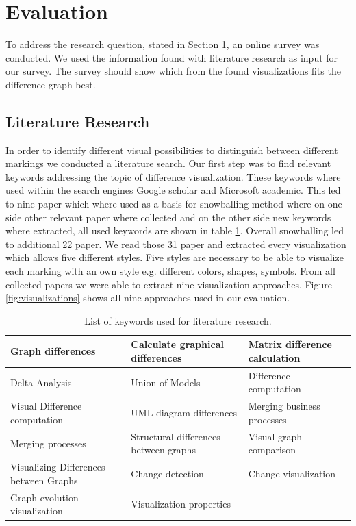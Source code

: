 \documentclass{llncs}
\begin{document}
\section{Evaluation} %
\label{sec:Evaluation} %
To address the research question, stated in Section 1, an online survey was conducted. We used the information found with literature research as input for our survey. The survey should show which from the found visualizations fits the difference graph best.

\subsection{Literature Research} %
\label{sec:LitResearch}
In order to identify different visual possibilities to distinguish between different markings we conducted a literature search. Our first step was to find relevant keywords addressing the topic of difference visualization. These keywords where used within the search engines Google scholar and Microsoft academic. This led to nine paper which where used as a basis for snowballing method where on one side other relevant paper where collected and on the other side new keywords where extracted, all used keywords are shown in table \ref{table:Keywords}. Overall snowballing led to additional 22 paper. We read those 31 paper and extracted every visualization which allows five different styles. Five styles are necessary to be able to visualize each marking with an own style e.g. different colors, shapes, symbols. From all collected papers we were able to extract nine visualization approaches. Figure \ref{fig:visualizations} shows all nine approaches used in our evaluation.

\begin{table}
	\centering
		\begin{tabular}{|p{4cm}|p{4cm}|p{4cm}|}
			\hline
			Graph differences & Calculate graphical differences & Matrix difference calculation 	\\
			\hline
			Delta Analysis & Union of Models &  Difference computation 	\\
			\hline
			Visual Difference computation & UML diagram differences &  Merging business processes 	\\
			\hline
			Merging processes  & Structural differences between graphs & Visual graph comparison 	\\
			\hline
			Visualizing Differences between Graphs & Change detection & Change visualization 	\\
			\hline
			Graph evolution visualization & Visualization properties &  	\\
			\hline
		\end{tabular}
		\vspace{10pt}
\caption{List of keywords used for literature research.}
\label{table:Keywords}
\end{table}
\end{document}
